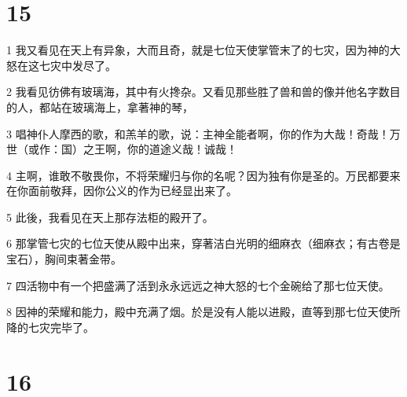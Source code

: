 \chapter{15}

\par 1 我又看见在天上有异象，大而且奇，就是七位天使掌管末了的七灾，因为神的大怒在这七灾中发尽了。
\par 2 我看见彷佛有玻璃海，其中有火搀杂。又看见那些胜了兽和兽的像并他名字数目的人，都站在玻璃海上，拿著神的琴，
\par 3 唱神仆人摩西的歌，和羔羊的歌，说：主神全能者啊，你的作为大哉！奇哉！万世（或作：国）之王啊，你的道途义哉！诚哉！
\par 4 主啊，谁敢不敬畏你，不将荣耀归与你的名呢？因为独有你是圣的。万民都要来在你面前敬拜，因你公义的作为已经显出来了。
\par 5 此後，我看见在天上那存法柜的殿开了。
\par 6 那掌管七灾的七位天使从殿中出来，穿著洁白光明的细麻衣（细麻衣；有古卷是宝石），胸间束著金带。
\par 7 四活物中有一个把盛满了活到永永远远之神大怒的七个金碗给了那七位天使。
\par 8 因神的荣耀和能力，殿中充满了烟。於是没有人能以进殿，直等到那七位天使所降的七灾完毕了。

\chapter{16}

